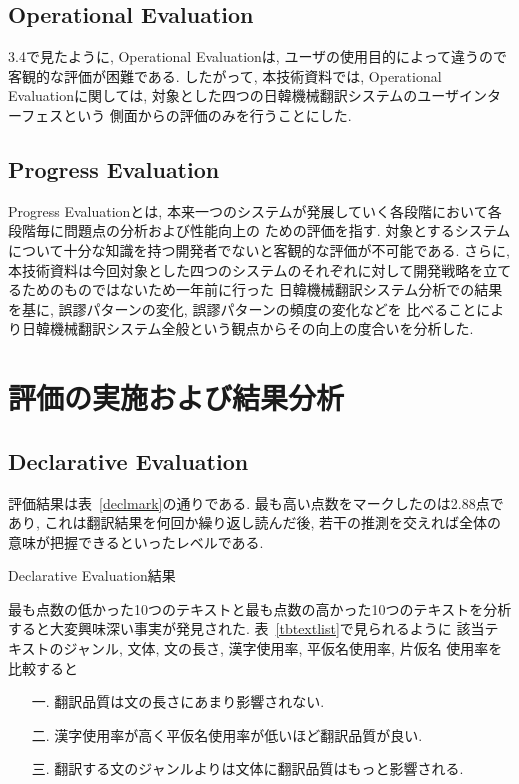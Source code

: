 \subsection{Operational Evaluation}
 3.4で見たように, Operational Evaluationは, ユーザの使用目的によって違うので客観的な評価が困難である. したがって, 
本技術資料では, Operational　Evaluationに関しては, 対象とした四つの日韓機械翻訳システムのユーザインターフェスという
側面からの評価のみを行うことにした. 

\subsection{Progress Evaluation }
Progress Evaluationとは, 本来一つのシステムが発展していく各段階において各段階毎に問題点の分析および性能向上の
ための評価を指す. 対象とするシステムについて十分な知識を持つ開発者でないと客観的な評価が不可能である. さらに, 
本技術資料は今回対象とした四つのシステムのそれぞれに対して開発戦略を立てるためのものではないため一年前に行った
日韓機械翻訳システム分析\cite{choiandkim}での結果を基に, 誤謬パターンの変化, 誤謬パターンの頻度の変化などを
比べることにより日韓機械翻訳システム全般という観点からその向上の度合いを分析した. 

\section{評価の実施および結果分析}
\subsection{Declarative Evaluation}
評価結果は表~\ref{declmark}の通りである. 最も高い点数をマークしたのは2.88点であり, これは翻訳結果を何回か繰り返し読んだ後, 
若干の推測を交えれば全体の意味が把握できるといったレベルである. 

\begin{table}
\begin{center}
\caption{\label{declmark} Declarative Evaluation結果}
\end{center}
\end{table}

最も点数の低かった10つのテキストと最も点数の高かった10つのテキストを分析
すると大変興味深い事実が発見された. 表~\ref{tbtextlist}で見られるように
該当テキストのジャンル, 文体, 文の長さ, 漢字使用率, 平仮名使用率, 片仮名
使用率を比較すると


\begin{itemize}
 \item[一.] 翻訳品質は文の長さにあまり影響されない. 
 \item[二.] 漢字使用率が高く平仮名使用率が低いほど翻訳品質が良い. 
 \item[三.] 翻訳する文のジャンルよりは文体に翻訳品質はもっと影響される. 
\end{itemize}

